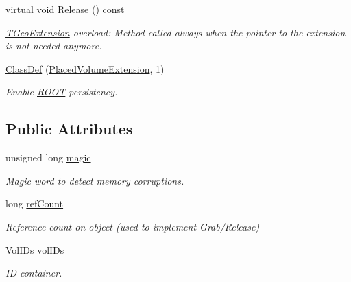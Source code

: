 \begin{DoxyCompactItemize}
virtual void \hyperlink{class_d_d4hep_1_1_geometry_1_1_placed_volume_extension_a7a32d8e82885c18e196ff79349e58737}{Release} () const
\begin{DoxyCompactList}\small\item\em \hyperlink{class_t_geo_extension}{T\+Geo\+Extension} overload\+: Method called always when the pointer to the extension is not needed anymore. \end{DoxyCompactList}\item 
\hyperlink{class_d_d4hep_1_1_geometry_1_1_placed_volume_extension_a947783c6c9088c7569f0fdd90a330a39}{Class\+Def} (\hyperlink{class_d_d4hep_1_1_geometry_1_1_placed_volume_extension}{Placed\+Volume\+Extension}, 1)
\begin{DoxyCompactList}\small\item\em Enable \hyperlink{namespace_r_o_o_t}{R\+O\+OT} persistency. \end{DoxyCompactList}\end{DoxyCompactItemize}
\subsection*{Public Attributes}
\begin{DoxyCompactItemize}
\item 
unsigned long \hyperlink{class_d_d4hep_1_1_geometry_1_1_placed_volume_extension_a1da5d313250546dc6deb19ed39b9ee90}{magic}
\begin{DoxyCompactList}\small\item\em Magic word to detect memory corruptions. \end{DoxyCompactList}\item 
long \hyperlink{class_d_d4hep_1_1_geometry_1_1_placed_volume_extension_a4feb981d8c7a9cfdd75e525ee0cfd527}{ref\+Count}
\begin{DoxyCompactList}\small\item\em Reference count on object (used to implement Grab/\+Release) \end{DoxyCompactList}\item 
\hyperlink{class_d_d4hep_1_1_geometry_1_1_placed_volume_extension_1_1_vol_i_ds}{Vol\+I\+Ds} \hyperlink{class_d_d4hep_1_1_geometry_1_1_placed_volume_extension_ad5f78671de81a717b16fdefd5483b153}{vol\+I\+Ds}
\begin{DoxyCompactList}\small\item\em ID container. \end{DoxyCompactList}\end{DoxyCompactItemize}


